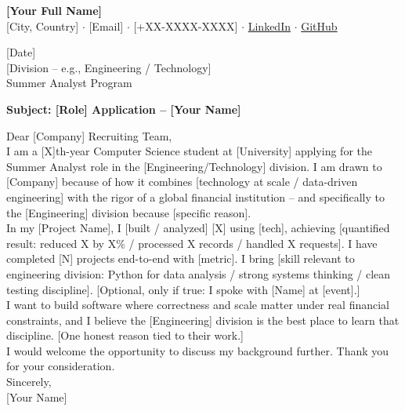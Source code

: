\documentclass[11pt, letterpaper]{article}
\begin{document}
\begin{center}
  {\LARGE\bfseries [Your Full Name]}\\[4pt]
  {\small [City, Country] $\cdot$ [Email] $\cdot$ [+XX-XXXX-XXXX] $\cdot$%
   \href{https://linkedin.com/in/yourname}{LinkedIn} $\cdot$%
   \href{https://github.com/yourname}{GitHub}}
\end{center}

\vspace{14pt}

[Date]\\[8pt]

[Division -- e.g., Engineering / Technology]\\
[Company] Summer Analyst Program

\vspace{10pt}
\textbf{Subject: [Role] Application -- [Your Name]}

\vspace{10pt}
Dear [Company] Recruiting Team,\\[8pt]

I am a [X]th-year Computer Science student at [University] applying for the
Summer Analyst role in the [Engineering/Technology] division. I am drawn to
[Company] because of how it combines [technology at scale / data-driven
engineering] with the rigor of a global financial institution -- and
specifically to the [Engineering] division because [specific reason].\\[8pt]

In my [Project Name], I [built / analyzed] [X] using [tech], achieving
[quantified result: reduced X by X\% / processed X records / handled X
requests]. I have completed [N] projects end-to-end with [metric]. I bring
[skill relevant to engineering division: Python for data analysis / strong
systems thinking / clean testing discipline]. [Optional, only if true: I
spoke with [Name] at [event].]\\[8pt]

I want to build software where correctness and scale matter under real
financial constraints, and I believe the [Engineering] division is the best
place to learn that discipline. [One honest reason tied to their work.]\\[8pt]

I would welcome the opportunity to discuss my background further. Thank you
for your consideration.\\[14pt]

Sincerely,\\[4pt]
[Your Name]
\end{document}
